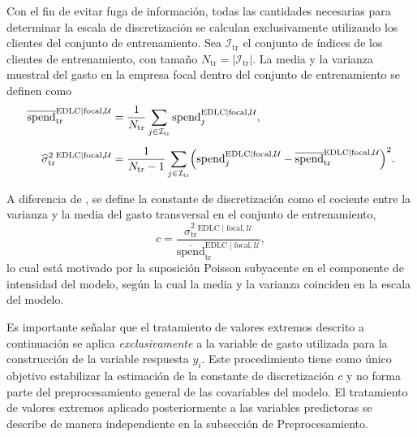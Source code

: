     Con el fin de evitar fuga de información, todas las cantidades necesarias para determinar la escala de discretización se calculan exclusivamente utilizando los clientes del conjunto de entrenamiento. Sea \(\mathcal{I}_{\mathrm{tr}}\) el conjunto de índices de los clientes de entrenamiento, con tamaño \(N_{\mathrm{tr}} = |\mathcal{I}_{\mathrm{tr}}|\). La media y la varianza muestral del gasto en la empresa focal dentro del conjunto de entrenamiento se definen como
    \begin{align*}
    \overline{\mathrm{spend}}_{\mathrm{tr}}^{\mathrm{EDLC}\mid\mathrm{focal},\mathcal{U}}
    &=
    \frac{1}{N_{\mathrm{tr}}}\sum_{j\in\mathcal{I}_{\mathrm{tr}}}
    \mathrm{spend}_{j}^{\mathrm{EDLC}\mid\mathrm{focal},\mathcal{U}},\\[0.5em]
    \widehat{\sigma}^2_{\mathrm{tr}}{}^{\mathrm{EDLC}\mid\mathrm{focal},\mathcal{U}}
    &=
    \frac{1}{N_{\mathrm{tr}}-1}\sum_{j\in\mathcal{I}_{\mathrm{tr}}}
    \Bigl(
    \mathrm{spend}_{j}^{\mathrm{EDLC}\mid\mathrm{focal},\mathcal{U}}
    -
    \overline{\mathrm{spend}}_{\mathrm{tr}}^{\mathrm{EDLC}\mid\mathrm{focal},\mathcal{U}}
    \Bigr)^2.
    \end{align*}
    
    A diferencia de \cite{glady2009predicting}, se define la constante de discretización como el cociente entre la varianza y la media del gasto transversal en el conjunto de entrenamiento,
    \[
    c
    =
    \frac{
    \widehat{\sigma}^2_{\mathrm{tr}}{}^{\mathrm{EDLC}\mid\mathrm{focal},\mathcal{U}}
    }{
    \overline{\mathrm{spend}}_{\mathrm{tr}}^{\mathrm{EDLC}\mid\mathrm{focal},\mathcal{U}}
    },
    \]
    lo cual está motivado por la suposición Poisson subyacente en el componente de intensidad del modelo, según la cual la media y la varianza coinciden en la escala del modelo.

    Es importante señalar que el tratamiento de valores extremos descrito a continuación se aplica \emph{exclusivamente} a la variable de gasto utilizada para la construcción de la variable respuesta \(y_i\). Este procedimiento tiene como único objetivo estabilizar la estimación de la constante de discretización \(c\) y no forma parte del preprocesamiento general de las covariables del modelo. El tratamiento de valores extremos aplicado posteriormente a las variables predictoras se describe de manera independiente en la subsección de Preprocesamiento.

